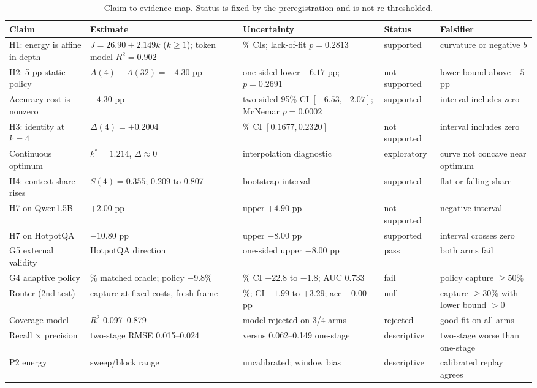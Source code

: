 \documentclass[a4paper,fleqn]{cas-sc}
\begin{document}
\begin{table}[pos=htbp]
  \centering
  \caption{Claim-to-evidence map. Status is fixed by the preregistration and is not re-thresholded.}
  \label{tab:claims}
  \scriptsize
  \setlength{\tabcolsep}{3pt}
  \begin{tabular}{@{}>{\raggedright\arraybackslash}p{2.8cm}>{\raggedright\arraybackslash}p{3.9cm}>{\raggedright\arraybackslash}p{3.4cm}>{\raggedright\arraybackslash}p{2.3cm}>{\raggedright\arraybackslash}p{2.8cm}@{}}
    \toprule
    \textbf{Claim} & \textbf{Estimate} & \textbf{Uncertainty} & \textbf{Status} & \textbf{Falsifier} \\
    \midrule
    H1: energy is affine in depth & $J=26.90+2.149k$ ($k\ge1$); token model $R^{2}=0.902$ & 95\% CIs; lack-of-fit $p=0.2813$ & supported & curvature or negative $b$ \\
    H2: 5 pp static policy & $A(4)-A(32)=-4.30$ pp & one-sided lower $-6.17$ pp; $p=0.2691$ & not supported & lower bound above $-5$ pp \\
    Accuracy cost is nonzero & $-4.30$ pp & two-sided 95\% CI $[-6.53,-2.07]$; McNemar $p=0.0002$ & supported & interval includes zero \\
    H3: identity at $k=4$ & $\Delta(4)=+0.2004$ & 95\% CI $[0.1677,0.2320]$ & not supported & interval includes zero \\
    Continuous optimum & $k^{*}=1.214$, $\Delta\approx0$ & interpolation diagnostic & exploratory & curve not concave near optimum \\
    H4: context share rises & $S(4)=0.355$; 0.209 to 0.807 & bootstrap interval & supported & flat or falling share \\
    H7 on Qwen1.5B & $+2.00$ pp & upper $+4.90$ pp & not supported & negative interval \\
    H7 on HotpotQA & $-10.80$ pp & upper $-8.00$ pp & supported & interval crosses zero \\
    G5 external validity & HotpotQA direction & one-sided upper $-8.00$ pp & pass & both arms fail \\
    G4 adaptive policy & 28.64\% matched oracle; policy $-9.8$\% & 95\% CI $-22.8$ to $-1.8$; AUC 0.733 & fail & policy capture $\ge50$\% \\
    Router (2nd test) & capture at fixed costs, fresh frame & 0.54\%; CI $-1.99$ to $+3.29$; acc $+0.00$ pp & null & capture $\ge30$\% with lower bound $>0$ \\
    Coverage model & $R^{2}$ 0.097--0.879 & model rejected on 3/4 arms & rejected & good fit on all arms \\
    Recall $\times$ precision & two-stage RMSE 0.015--0.024 & versus 0.062--0.149 one-stage & descriptive & two-stage worse than one-stage \\
    P2 energy & sweep/block range & uncalibrated; window bias & descriptive & calibrated replay agrees \\
    \bottomrule
  \end{tabular}
\end{table}
\end{document}
